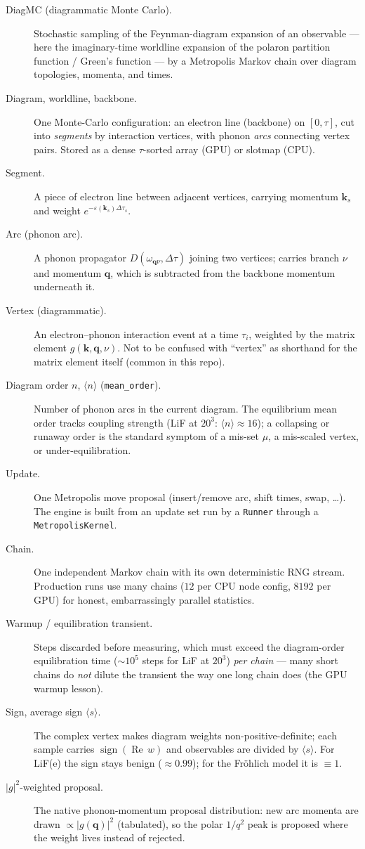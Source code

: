 \documentclass[11pt]{article}
\newcommand{\kv}{\mathbf{k}}
\newcommand{\qv}{\mathbf{q}}
\newcommand{\term}[1]{\item[#1.]}
\begin{document}
\begin{description}
\term{DiagMC (diagrammatic Monte Carlo)} Stochastic sampling of the Feynman-diagram
  expansion of an observable --- here the imaginary-time worldline expansion of the
  polaron partition function / Green's function --- by a Metropolis Markov chain over
  diagram topologies, momenta, and times.

\term{Diagram, worldline, backbone} One Monte-Carlo configuration: an electron line
  (backbone) on $[0,\tau]$, cut into \emph{segments} by interaction vertices, with
  phonon \emph{arcs} connecting vertex pairs. Stored as a dense $\tau$-sorted array
  (GPU) or slotmap (CPU).

\term{Segment} A piece of electron line between adjacent vertices, carrying momentum
  $\kv_{s}$ and weight $e^{-\varepsilon(\kv_{s})\Delta\tau_{s}}$.

\term{Arc (phonon arc)} A phonon propagator $D(\omega_{\qv\nu},\Delta\tau)$ joining
  two vertices; carries branch $\nu$ and momentum $\qv$, which is subtracted from the
  backbone momentum underneath it.

\term{Vertex (diagrammatic)} An electron--phonon interaction event at a time
  $\tau_{i}$, weighted by the matrix element $g(\kv,\qv,\nu)$. Not to be confused with
  ``vertex'' as shorthand for the matrix element itself (common in this repo).

\term{Diagram order $n$, $\langle n\rangle$ (\texttt{mean\_order})} Number of phonon
  arcs in the current diagram. The equilibrium mean order tracks coupling strength
  (LiF at $20^{3}$: $\langle n\rangle\approx16$); a collapsing or runaway order is the
  standard symptom of a mis-set $\mu$, a mis-scaled vertex, or under-equilibration.

\term{Update} One Metropolis move proposal (insert/remove arc, shift times, swap,
  \dots). The engine is built from an update set run by a \texttt{Runner} through a
  \texttt{MetropolisKernel}.

\term{Chain} One independent Markov chain with its own deterministic RNG stream.
  Production runs use many chains ($12$ per CPU node config, $8192$ per GPU) for
  honest, embarrassingly parallel statistics.

\term{Warmup / equilibration transient} Steps discarded before measuring, which must
  exceed the diagram-order equilibration time ($\sim10^{5}$ steps for LiF at
  $20^{3}$) \emph{per chain} --- many short chains do \emph{not} dilute the transient
  the way one long chain does (the GPU warmup lesson).

\term{Sign, average sign $\langle s\rangle$} The complex vertex makes diagram weights
  non-positive-definite; each sample carries $\operatorname{sign}(\operatorname{Re}\,w)$
  and observables are divided by $\langle s\rangle$. For LiF(e) the sign stays
  benign ($\approx0.99$); for the Fr\"ohlich model it is $\equiv1$.

\term{$|g|^{2}$-weighted proposal} The native phonon-momentum proposal distribution:
  new arc momenta are drawn $\propto|g(\qv)|^{2}$ (tabulated), so the polar $1/q^{2}$
  peak is proposed where the weight lives instead of rejected.
\end{description}
\end{document}
